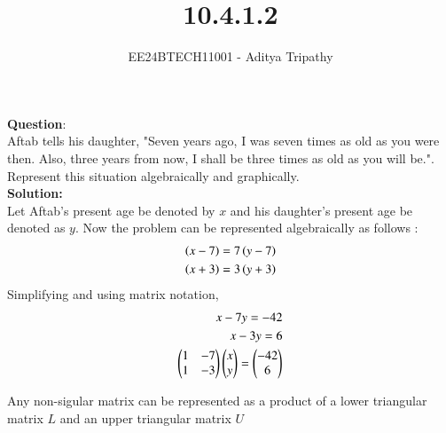 \documentclass[journal]{IEEEtran}
\begin{document}

\vspace{3cm}

\title{10.4.1.2}
\author{EE24BTECH11001 - Aditya Tripathy}
 \maketitle
{\let\newpage\relax\maketitle}

\renewcommand{\thefigure}{\theenumi}
\renewcommand{\thetable}{\theenumi}
\setlength{\intextsep}{10pt} %


\renewcommand{\thetable}{\theenumi}


\textbf{Question}:\\
Aftab tells his daughter, "Seven years ago, I was seven times as old as you were then.
Also, three years from now, I shall be three times as old as you will be.". Represent
this situation algebraically and graphically.
\\
\textbf{Solution: }\\
Let Aftab's present age be denoted by $x$ and his daughter's present age be denoted as $y$.
Now the problem can be represented algebraically as follows :
\begin{align}
    \left(x-7\right) = 7\left(y-7\right)\\
    \left(x+3\right) = 3\left(y+3\right)
\end{align}
Simplifying and using matrix notation,
\begin{align}
    x -7y = -42\\
    x - 3y = 6\\
    \begin{pmatrix}
        1 & -7\\
        1 & -3
    \end{pmatrix} \begin{pmatrix}x \\ y\end{pmatrix}= \begin{pmatrix} -42 \\ 6\end{pmatrix}
\end{align}

Any non-sigular matrix can be represented as a product of a lower triangular matrix $L$ and an
upper triangular matrix $U$
\end{document}

